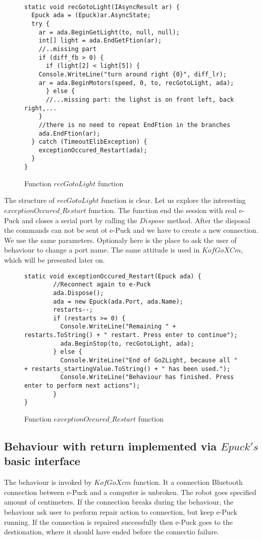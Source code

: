 \begin{figure}[!hbp]
\begin{lstlisting}
	
static void recGotoLight(IAsyncResult ar) {
  Epuck ada = (Epuck)ar.AsyncState;
  try {
    ar = ada.BeginGetLight(to, null, null);
    int[] light = ada.EndGetFtion(ar);
    //..missing part
    if (diff_fb > 0) {
      if (light[2] < light[5]) {
	Console.WriteLine("turn around right {0}", diff_lr);
	ar = ada.BeginMotors(speed, 0, to, recGotoLight, ada);
      } else {
      //...missing part: the lighst is on front left, back right,...
    }
    //there is no need to repeat EndFtion in the branches
    ada.EndFtion(ar);
  } catch (TimeoutElibException) {
    exceptionOccured_Restart(ada);
  }
}
\end{lstlisting}
\caption{Function $recGotoLight$ function} \label{go2light}
\end{figure}
	The structure of $recGotoLight$ function is clear. Let us explore the interesting $exceptionOccured\_Restart$ function.
	The function end the session with real e-Puck and closes a serial port by calling the $Dispose$ method.
	After the disposal the commands can not be sent ot e-Puck and we have to create a new connection. We use the same parameters.
	Optionaly here is the place to ask the user of behaviour to change a port name.
	The same attitude is used in $KofGoXCm$, which will be presented later on.
\begin{figure}[!hbp]
\begin{lstlisting}
static void exceptionOccured_Restart(Epuck ada) {
        //Reconnect again to e-Puck
        ada.Dispose();
        ada = new Epuck(ada.Port, ada.Name);
        restarts--;
        if (restarts >= 0) {
          Console.WriteLine("Remaining " + restarts.ToString() + " restart. Press enter to continue");
          ada.BeginStop(to, recGotoLight, ada);
        } else {
          Console.WriteLine("End of Go2Light, because all " + restarts_startingValue.ToString() + " has been used.");
          Console.WriteLine("Behaviour has finished. Press enter to perform next actions");
        }
}
\end{lstlisting}
\caption{Function $exceptionOccured\_Restart$ function} \label{restart}
\end{figure}

\subsection{Behaviour with return implemented via $Epuck's$ basic interface}\label{sec:kofgoxcm}
	The behaviour is invoked by $KofGoXcm$ function. It a connection Bluetooth connection between e-Puck and a computer is unbroken.
	The robot goes specified amount of centimeters. If the connection breaks during the behaviour, the behaviour ask user to perform repair action to connection,
	but keep e-Puck running. If the connection is repaired successfully then e-Puck goes to the destionation, where it should have ended before the connectio failure.

